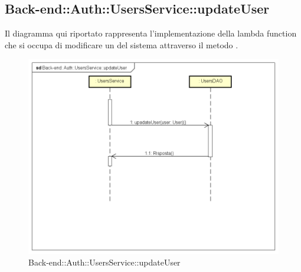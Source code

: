 \subsection{Back-end::Auth::UsersService::updateUser}
Il diagramma qui riportato rappresenta l'implementazione della lambda function che si occupa di modificare un  del sistema attraverso il metodo .
\begin{figure}[h] \centering \includegraphics[width=\textwidth,height=\textheight,keepaspectratio]{images/diagrams/back-end/Ufficial_Backend/Back-endAuthUsersServiceupdateUser.png} 	\caption{Back-end::Auth::UsersService::updateUser}
\end{figure}
\newpage

